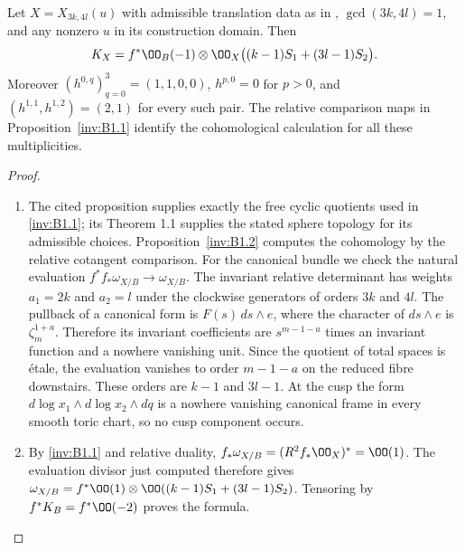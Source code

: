 \begin{proposition}\hypertarget{tag-01S5}{}\label{inv:B2.1}

Let $X=X_{3k,4l}(u)$ with admissible translation data as in
\citet[Theorem~1.1, p.~1, and Proposition~2.3, pp.~5--6]{ViaclovskyLog2026},
$\gcd(3k,4l)=1$, and any nonzero $u$ in its construction domain.
Then
\[
K_X=f^*\OO_B(-1)\otimes
\OO_X\bigl((k-1)S_1+(3l-1)S_2\bigr).
\]
Moreover $(h^{0,q})_{q=0}^3=(1,1,0,0)$, $h^{p,0}=0$ for $p>0$,
and $(h^{1,1},h^{1,2})=(2,1)$ for every such pair.
The relative comparison maps in Proposition~\ref{inv:B1.1}
identify the cohomological calculation for all these multiplicities.
\end{proposition}


\begin{proof}
\begin{enumerate}[label=\arabic*.,leftmargin=*]
\item The cited proposition supplies exactly the free cyclic quotients used
in \ref{inv:B1.1}; its Theorem 1.1 supplies the stated sphere topology for its
admissible choices. Proposition~\ref{inv:B1.2} computes the cohomology by the relative
cotangent comparison.
For the canonical bundle we check the natural evaluation
$f^*f_*\omega_{X/B}\to\omega_{X/B}$.
The invariant relative determinant has weights $a_1=2k$ and $a_2=l$
under the clockwise generators of orders $3k$ and $4l$. The pullback
of a canonical form is $F(s)\,ds\wedge e$, where the character of
$ds\wedge e$ is $\zeta_m^{1+a}$. Therefore its invariant coefficients
are $s^{m-1-a}$ times an invariant function and a nowhere vanishing
unit. Since the quotient of total spaces is \'etale, the evaluation
vanishes to order $m-1-a$ on the reduced fibre downstairs. These orders
are $k-1$ and $3l-1$. At the cusp the form
$d\log x_1\wedge d\log x_2\wedge dq$ is a nowhere vanishing canonical
frame in every smooth toric chart, so no cusp component occurs.

\item By \ref{inv:B1.1} and relative duality,
$f_*\omega_{X/B}=(R^2f_*\OO_X)^*=\OO(1)$.
The evaluation divisor just computed therefore gives
$\omega_{X/B}=f^*\OO(1)\otimes
\OO((k-1)S_1+(3l-1)S_2)$. Tensoring by $f^*K_B=f^*\OO(-2)$
proves the formula.
\end{enumerate}
\end{proof}